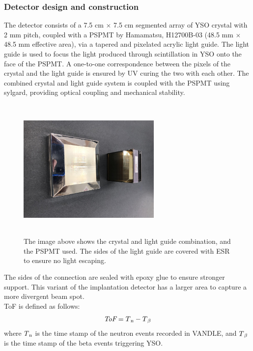 \documentclass[a4paper,12pt,twoside]{report}
\begin{document}
\subsubsection{Detector design and construction}
 The detector consists of a 7.5 cm $\times$ 7.5 cm segmented array of YSO crystal with 2 mm pitch, coupled with a PSPMT by Hamamatsu, H12700B-03 (48.5 mm $\times$ 48.5 mm effective area), via a tapered and pixelated acrylic light guide. The light guide is used to focus the light produced through scintillation in YSO onto the face of the PSPMT. A one-to-one correspondence between the pixels of the crystal and the light guide is ensured by UV curing the two with each other. The combined crystal and light guide system is coupled with the PSPMT using sylgard, providing optical coupling and mechanical stability. 
\begin{figure}[h!]
    \centering
    \includegraphics[width=7cm,height=7cm]{new_yso_tapered_light_guide.jpg}
    \caption[The image above shows the crystal and light guide]{The image above shows the crystal and light guide combination, and the PSPMT used. The sides of the light guide are covered with ESR to ensure no light escaping.}
    \label{fig:yso_light_guidel}
\end{figure}
The sides of the connection are sealed with epoxy glue to ensure stronger support. This variant of the implantation detector has a larger area to capture a more divergent beam spot. \\
ToF is defined as follows:
\begin{equation}
    \textit{ToF}=T\textsubscript{n}-T\textsubscript{$\beta$}
\end{equation}
where $T\textsubscript{n}$ is the time stamp of the neutron events recorded in VANDLE, and $T\textsubscript{$\beta$}$ is the time stamp of the beta events triggering YSO.
\end{document}
